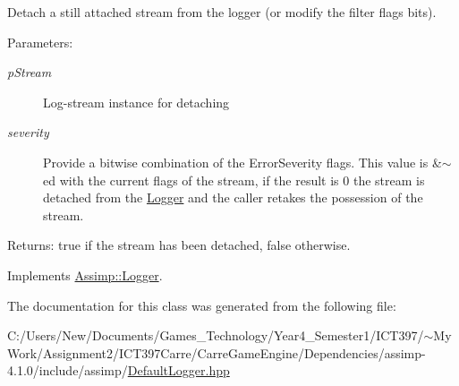 Detach a still attached stream from the logger (or modify the filter flags bits). 

\begin{Desc}
\item[Parameters:]
\begin{description}
\item[{\em pStream}]Log-stream instance for detaching \item[{\em severity}]Provide a bitwise combination of the ErrorSeverity flags. This value is \&$\sim$ed with the current flags of the stream, if the result is 0 the stream is detached from the \hyperlink{class_assimp_1_1_logger}{Logger} and the caller retakes the possession of the stream. \end{description}
\end{Desc}
\begin{Desc}
\item[Returns:]true if the stream has been detached, false otherwise. \end{Desc}
 

Implements \hyperlink{class_assimp_1_1_logger_9489263727f29fecbd705d5c8d2590c0}{Assimp::Logger}.

The documentation for this class was generated from the following file:\begin{CompactItemize}
\item 
C:/Users/New/Documents/Games\_\-Technology/Year4\_\-Semester1/ICT397/$\sim$My Work/Assignment2/ICT397Carre/CarreGameEngine/Dependencies/assimp-4.1.0/include/assimp/\hyperlink{_default_logger_8hpp}{DefaultLogger.hpp}\end{CompactItemize}

